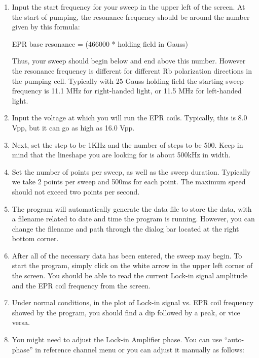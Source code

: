 \begin{enumerate}

\item  Input the start frequency for your sweep in the upper
left of the screen.  At the start of
pumping, the resonance frequency should be around the number given by
this formula:

EPR base resonance = (466000 * holding field in Gauss)

Thus, your sweep should begin below and end above this number.
However the resonance frequency is different for different Rb polarization
directions 
in the pumping cell.  Typically with 25 Gauss holding field the starting 
sweep frequency is 11.1 MHz for right-handed light, 
or 11.5 MHz for left-handed light.  

\item Input the voltage at which you will run the EPR coils.  Typically,
this is 8.0 Vpp, but it can go as high as 16.0 Vpp.

\item Next, set the step to be 1KHz and the number of steps to be 500.
Keep in mind that the lineshape you are looking for is about 500kHz in
width. 
\item Set the number of points per sweep, as well as the sweep
duration.  Typically we take 2 points per sweep and 500ms for each point.
The maximum speed should not exceed two points per second. 

\item
The program will automatically generate the data file to store the data, 
with a filename related to date and time the program is running.  However,
you can change the filename and path through the dialog bar located at the
right bottom corner.

\item After all of the necessary data has been entered, the sweep may begin.  
To start the program, simply click on the white arrow in the upper
left corner of the screen.  You should be able to read the current Lock-in
signal amplitude and the EPR coil frequency from the screen.

\item Under normal conditions,
 in the plot of Lock-in signal vs. EPR coil frequency showed
by the program, you should find a dip followed by a peak, or vice versa.  

\item You might need to adjust the Lock-in Amplifier phase. You can use
``auto-phase'' in reference channel menu or you can adjust it manually
as follows:


\end{enumerate}
